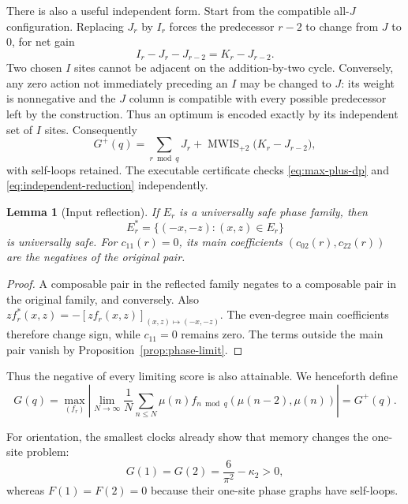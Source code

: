 \documentclass[11pt]{article}
\newtheorem{lemma}[theorem]{Lemma}
\theoremstyle{definition}
\theoremstyle{remark}
\newcommand{\mob}{\mu}
\newcommand{\kap}{\kappa_2}
\begin{document}
There is also a useful independent form.  Start from the compatible all-$J$
configuration.  Replacing $J_r$ by $I_r$ forces the predecessor $r-2$ to
change from $J$ to $0$, for net gain
\begin{equation}
                 I_r-J_r-J_{r-2}=K_r-J_{r-2}.
 \label{eq:vertex-gain}
\end{equation}
Two chosen $I$ sites cannot be adjacent on the addition-by-two cycle.
Conversely, any zero action not immediately preceding an $I$ may be changed
to $J$: its weight is nonnegative and the $J$ column is compatible with
every possible predecessor left by the construction.  Thus an optimum is
encoded exactly by its independent set of $I$ sites.
Consequently
\begin{equation}
 G^+(q)=\sum_{r\bmod q}J_r+
 \operatorname{MWIS}_{+2}\bigl(K_r-J_{r-2}\bigr),
 \label{eq:independent-reduction}
\end{equation}
with self-loops retained.  The executable certificate checks
\eqref{eq:max-plus-dp} and \eqref{eq:independent-reduction} independently.

\begin{lemma}[Input reflection]
If $E_r$ is a universally safe phase family, then
\[
                E_r^*=\{(-x,-z):(x,z)\in E_r\}
\]
is universally safe.  For $c_{11}(r)=0$, its main coefficients
$(c_{02}(r),c_{22}(r))$ are the negatives of the original pair.
\end{lemma}

\begin{proof}
A composable pair in the reflected family negates to a composable pair in
the original family, and conversely.  Also
$zf_r^*(x,z)=-[zf_r(x,z)]_{(x,z)\mapsto(-x,-z)}$.  The even-degree main
coefficients therefore change sign, while $c_{11}=0$ remains zero.  The
terms outside the main pair vanish by Proposition~\ref{prop:phase-limit}.
\end{proof}

Thus the negative of every limiting score is also attainable.  We henceforth
define
\begin{equation}
 \boxed{\displaystyle
 G(q)=\max_{(f_r)}\left|\lim_{N\to\infty}\frac1N
 \sum_{n\le N}\mob(n)f_{n\bmod q}(\mob(n-2),\mob(n))\right|
 =G^+(q).}
 \label{eq:G-definition}
\end{equation}

For orientation, the smallest clocks already show that memory changes the
one-site problem:
\begin{equation}
                 G(1)=G(2)=\frac6{\pi^2}-\kap>0,
 \label{eq:q1}
\end{equation}
whereas $F(1)=F(2)=0$ because their one-site phase graphs have self-loops.
\end{document}
